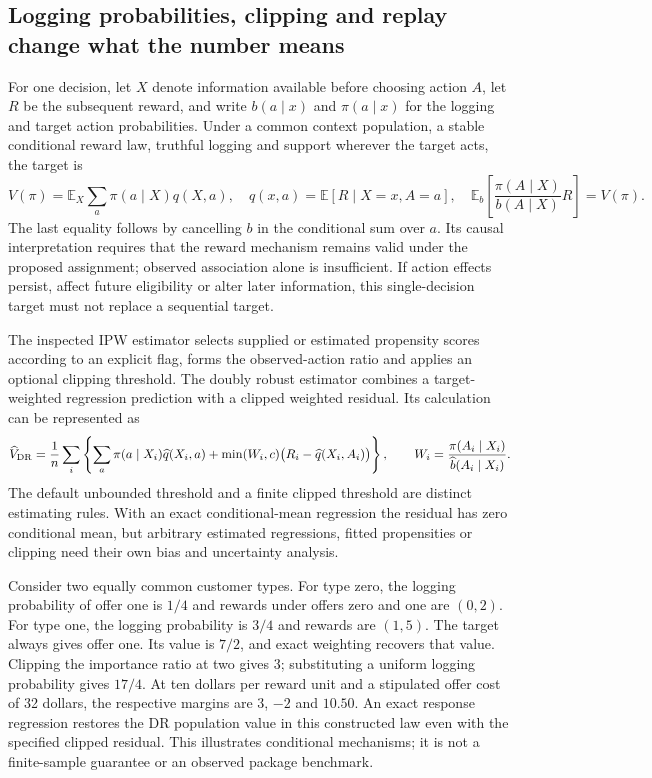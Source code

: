 \subsection{Logging probabilities, clipping and replay change what the number means}
\label{exec23:obp-target}
For one decision, let $X$ denote information available before choosing action
$A$, let $R$ be the subsequent reward, and write $b(a\mid x)$ and
$\pi(a\mid x)$ for the logging and target action probabilities. Under a common
context population, a stable conditional reward law, truthful logging and
support wherever the target acts, the target is
\[
 V(\pi)=\mathbb E_X\sum_a\pi(a\mid X)q(X,a),
 \quad q(x,a)=\mathbb E[R\mid X=x,A=a],
 \quad \mathbb E_b\!\left[\frac{\pi(A\mid X)}{b(A\mid X)}R\right]=V(\pi).
\]
The last equality follows by cancelling $b$ in the conditional sum over $a$.
Its causal interpretation requires that the reward mechanism remains valid
under the proposed assignment; observed association alone is insufficient.
If action effects persist, affect future eligibility or alter later information,
this single-decision target must not replace a sequential target.

The inspected IPW estimator selects supplied or estimated propensity scores
according to an explicit flag, forms the observed-action ratio and applies an
optional clipping threshold. The doubly robust estimator combines a
target-weighted regression prediction with a clipped weighted residual. Its
calculation can be represented as
\[
 \widehat V_{\rm DR}=\frac1n\sum_i\left\{
 \sum_a\pi(a\mid X_i)\widehat q(X_i,a)
 +\min(W_i,c)\big(R_i-\widehat q(X_i,A_i)\big)\right\},
 \qquad W_i=\frac{\pi(A_i\mid X_i)}{\widehat b(A_i\mid X_i)}.
\]
The default unbounded threshold and a finite clipped threshold are distinct
estimating rules. With an exact conditional-mean regression the residual has
zero conditional mean, but arbitrary estimated regressions, fitted propensities
or clipping need their own bias and uncertainty analysis.
\citep{exec23_obp_sources}

Consider two equally common customer types. For type zero, the logging
probability of offer one is $1/4$ and rewards under offers zero and one are
$(0,2)$. For type one, the logging probability is $3/4$ and rewards are $(1,5)$.
The target always gives offer one. Its value is $7/2$, and exact weighting
recovers that value. Clipping the importance ratio at two gives $3$; substituting
a uniform logging probability gives $17/4$. At ten dollars per reward unit and
a stipulated offer cost of 32 dollars, the respective margins are $3$, $-2$ and
$10.50$. An exact response regression restores the DR population value in this
constructed law even with the specified clipped residual. This illustrates
conditional mechanisms; it is not a finite-sample guarantee or an observed
package benchmark. \citep{exec23_obp_reference}

